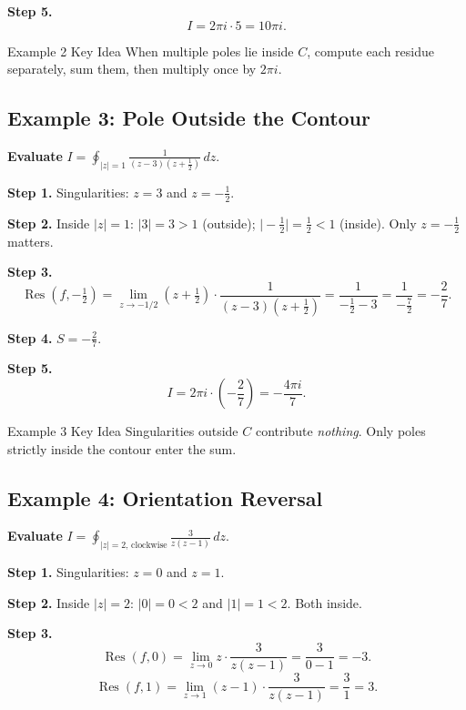 \documentclass[12pt,a4paper]{article}
\begin{document}
\textbf{Step 5.}
\[
  I = 2\pi i \cdot 5 = \boxed{10\pi i}.
\]

\begin{learnbox}{Example 2 Key Idea}
When multiple poles lie inside $C$, compute each residue separately,
sum them, then multiply once by $2\pi i$.
\end{learnbox}

\subsection*{Example 3: Pole Outside the Contour}

\textbf{Evaluate} $\displaystyle I = \oint_{|z|=1}
  \frac{1}{(z-3)(z+\frac{1}{2})}\,dz$.

\textbf{Step 1.} Singularities: $z=3$ and $z=-\tfrac{1}{2}$.

\textbf{Step 2.} Inside $|z|=1$: $|3|=3>1$ (outside); $\bigl|-\tfrac{1}{2}\bigr|=\tfrac{1}{2}<1$ (inside).
Only $z=-\tfrac{1}{2}$ matters.

\textbf{Step 3.}
\[
  \operatorname{Res}\!\left(f,-\tfrac{1}{2}\right)
  = \lim_{z\to -1/2}\!\left(z+\tfrac{1}{2}\right)\cdot\frac{1}{(z-3)(z+\frac{1}{2})}
  = \frac{1}{-\tfrac{1}{2}-3} = \frac{1}{-\tfrac{7}{2}} = -\frac{2}{7}.
\]

\textbf{Step 4.} $S = -\tfrac{2}{7}$.

\textbf{Step 5.}
\[
  I = 2\pi i \cdot\!\left(-\frac{2}{7}\right) = \boxed{-\frac{4\pi i}{7}}.
\]

\begin{learnbox}{Example 3 Key Idea}
Singularities outside $C$ contribute \emph{nothing}. Only poles strictly inside
the contour enter the sum.
\end{learnbox}

\subsection*{Example 4: Orientation Reversal}

\textbf{Evaluate} $\displaystyle I = \oint_{|z|=2,\,\text{clockwise}}
  \frac{3}{z(z-1)}\,dz$.

\textbf{Step 1.} Singularities: $z=0$ and $z=1$.

\textbf{Step 2.} Inside $|z|=2$: $|0|=0<2$ and $|1|=1<2$. Both inside.

\textbf{Step 3.}
\[
  \operatorname{Res}(f,0)
  = \lim_{z\to 0}z\cdot\frac{3}{z(z-1)}
  = \frac{3}{0-1} = -3.
\]
\[
  \operatorname{Res}(f,1)
  = \lim_{z\to 1}(z-1)\cdot\frac{3}{z(z-1)}
  = \frac{3}{1} = 3.
\]
\end{document}
